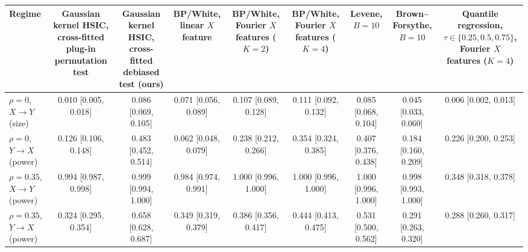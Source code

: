 \begin{tabular}{lcccccccc}
Regime & Gaussian kernel HSIC, cross-fitted plug-in permutation test & Gaussian kernel HSIC, cross-fitted debiased test (ours) & BP/White, linear $X$ feature & BP/White, Fourier $X$ features ($K=2$) & BP/White, Fourier $X$ features ($K=4$) & Levene, $B=10$ & Brown--Forsythe, $B=10$ & Quantile regression, $\tau\in\{0.25,0.5,0.75\}$, Fourier $X$ features ($K=4$) \\
\hline
$\rho=0$, $X\to Y$ (size) & 0.010 [0.005, 0.018] & 0.086 [0.069, 0.105] & 0.071 [0.056, 0.089] & 0.107 [0.089, 0.128] & 0.111 [0.092, 0.132] & 0.085 [0.068, 0.104] & 0.045 [0.033, 0.060] & 0.006 [0.002, 0.013] \\
$\rho=0$, $Y\to X$ (power) & 0.126 [0.106, 0.148] & 0.483 [0.452, 0.514] & 0.062 [0.048, 0.079] & 0.238 [0.212, 0.266] & 0.354 [0.324, 0.385] & 0.407 [0.376, 0.438] & 0.184 [0.160, 0.209] & 0.226 [0.200, 0.253] \\
$\rho=0.35$, $X\to Y$ (power) & 0.994 [0.987, 0.998] & 0.999 [0.994, 1.000] & 0.984 [0.974, 0.991] & 1.000 [0.996, 1.000] & 1.000 [0.996, 1.000] & 1.000 [0.996, 1.000] & 0.998 [0.993, 1.000] & 0.348 [0.318, 0.378] \\
$\rho=0.35$, $Y\to X$ (power) & 0.324 [0.295, 0.354] & 0.658 [0.628, 0.687] & 0.349 [0.319, 0.379] & 0.386 [0.356, 0.417] & 0.444 [0.413, 0.475] & 0.531 [0.500, 0.562] & 0.291 [0.263, 0.320] & 0.288 [0.260, 0.317] \\
\end{tabular}
